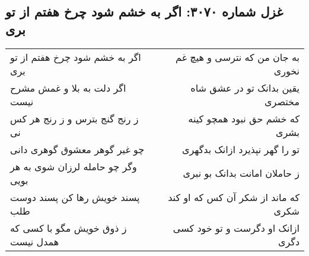 \begin{center}
\section*{غزل شماره ۳۰۷۰: اگر به خشم شود چرخ هفتم از تو بری}
\label{sec:3070}
\begin{longtable}{l p{0.5cm} r}
اگر به خشم شود چرخ هفتم از تو بری
&&
به جان من که نترسی و هیچ غم نخوری
\\
اگر دلت به بلا و غمش مشرح نیست
&&
یقین بدانک تو در عشق شاه مختصری
\\
ز رنج گنج بترس و ز رنج هر کس نی
&&
که خشم حق نبود همچو کینه بشری
\\
چو غیر گوهر معشوق گوهری دانی
&&
تو را گهر نپذیرد ازانک بدگهری
\\
وگر چو حامله لرزان شوی به هر بویی
&&
ز حاملان امانت بدانک بو نبری
\\
پسند خویش رها کن پسند دوست طلب
&&
که ماند از شکر آن کس که او کند شکری
\\
ز ذوق خویش مگو با کسی که همدل نیست
&&
ازانک او دگرست و تو خود کسی دگری
\\
\end{longtable}
\end{center}
